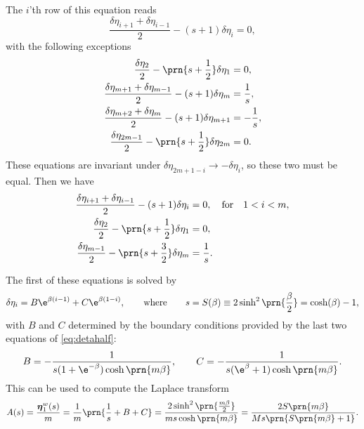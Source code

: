 \documentclass[12pt]{article}
\newcommand{\etw}{\boldsymbol{\eta}^w}
\begin{document}
The $i$'th row of this equation reads
%
\begin{equation}\label{eq:detarow}
  \frac{\delta\eta_{i+1}+\delta\eta_{i-1}}{2} - (s+1)\delta\eta_i = 0,
\end{equation}
%
with the following exceptions
%
\begin{equation}\label{eq:detabnduni}
\begin{aligned}
  \frac{\delta\eta_2}{2} - \prn{s+\frac{1}{2}}\delta\eta_1 &= 0, \\
  \frac{\delta\eta_{m+1}+\delta\eta_{m-1}}{2} - (s+1)\delta\eta_{m} &= \frac{1}{s},\\
  \frac{\delta\eta_{m+2}+\delta\eta_{m}}{2} - (s+1)\delta\eta_{m+1} &= -\frac{1}{s},\\
  \frac{\delta\eta_{2m-1}}{2} - \prn{s+\frac{1}{2}}\delta\eta_{2m} &= 0.
\end{aligned}
\end{equation}
%
These equations are invariant under $\delta\eta_{2m+1-i} \to -\delta\eta_i$, so these two must be equal.
Then we have
%
\begin{equation}\label{eq:detahalf}
\begin{aligned}
  \frac{\delta\eta_{i+1}+\delta\eta_{i-1}}{2} - (s+1)\delta\eta_i &= 0,
  \quad\text{for}\quad 1<i<m, \\
  \frac{\delta\eta_2}{2} - \prn{s+\frac{1}{2}}\delta\eta_1 &= 0, \\
  \frac{\delta\eta_{m-1}}{2} - \prn{s+\frac{3}{2}}\delta\eta_{m} &= \frac{1}{s}.
\end{aligned}
\end{equation}
%

The first of these equations is solved by
%
\begin{equation}\label{eq:detagensol}
  \delta\eta_i = B\e^{\beta(i-1)} + C\e^{\beta(1-i)},
  \qquad\text{where}\qquad
  s = S(\beta) \equiv 2 \sinh^2 \prn{\frac{\beta}{2}}
    = \cosh (\beta) - 1,
\end{equation}
%
with $B$ and $C$ determined by the boundary conditions provided by the last two equations of \eqref{eq:detahalf}:
%
\begin{equation}\label{eq:unicoeffs}
  B = -\frac{1}{s(1 + \e^{-\beta}) \cosh \prn{m \beta}},
  \qquad
  C = -\frac{1}{s(\e^{\beta} + 1) \cosh \prn{m \beta}}.
\end{equation}
%
This can be used to compute the Laplace transform
%
\begin{equation}\label{eq:unilaplace}
  A(s) = \frac{\etw_1(s)}{m}
   = \frac{1}{m}\prn{\frac{1}{s}+B+C}
   = \frac{2\sinh^2\prn{\frac{m \beta}{2}}}{m s \cosh\prn{m \beta}}
   = \frac{2 S\prn{m \beta}}{M s \prn{S\prn{m \beta} + 1}}.
\end{equation}
%
\end{document}
